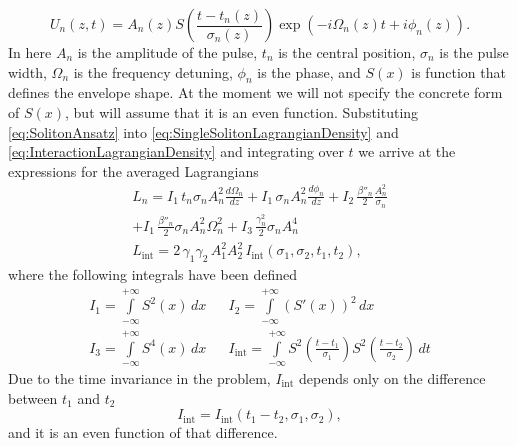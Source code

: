 \documentclass[a4paper,11pt]{article}
\begin{document}
\begin{equation}
  \label{eq:SolitonAnsatz}
  U_{n}(z, t) = A_{n}(z) S\left(
    \frac{t - t_{n}(z)}{\sigma_{n}(z)}
  \right) \exp\left(
    - i \Omega_{n}(z) t + i \phi_{n}(z)
  \right).
\end{equation}
In here $A_{n}$ is the amplitude of the pulse, $t_{n}$ is the central position, $\sigma_{n}$ is the pulse width, $\Omega_{n}$ is the frequency detuning, $\phi_{n}$ is the phase, and $S(x)$ is function that defines the envelope shape. At the moment we will not specify the concrete form of $S(x)$, but will assume that it is an even function. Substituting \eqref{eq:SolitonAnsatz} into \eqref{eq:SingleSolitonLagrangianDensity} and \eqref{eq:InteractionLagrangianDensity} and integrating over $t$ we arrive at the expressions for the averaged Lagrangians
\begin{gather}
  L_{n} =
    I_{1} \, t_{n} \sigma_{n} A_{n}^{2} \frac{d \Omega_{n}}{d z} +
    I_{1} \, \sigma_{n} A_{n}^{2} \frac{d \phi_{n}}{d z} +
    I_{2} \, \frac{\beta''_{n}}{2} \frac{A_{n}^{2}}{\sigma_{n}} \nonumber \\
    + I_{1} \, \frac{\beta''_{n}}{2} \sigma_{n} A_{n}^{2} \Omega_{n}^{2} +
    I_{3} \, \frac{\gamma_{n}^{2}}{2} \sigma_{n} A_{n}^{4} \\
  L_{\text{int}} =
    2 \, \gamma_{1} \gamma_{2} \, A_{1}^{2} A_{2}^{2} \,
    I_{\text{int}}(\sigma_{1}, \sigma_{2}, t_{1}, t_{2}),
\end{gather}
where the following integrals have been defined
\begin{align*}
  I_{1} =
    \int \limits_{-\infty}^{+\infty}
    S^{2}(x) \, dx &&
  I_{2} =
    \int \limits_{-\infty}^{+\infty}
    (S'(x))^{2} \, dx \\
  I_{3} =
    \int \limits_{-\infty}^{+\infty}
    S^{4}(x) \, dx &&
  I_{\text{int}} =
    \int \limits_{-\infty}^{+\infty}
    S^{2}\left(
      \frac{t - t_{1}}{\sigma_{1}}
    \right)
    S^{2}\left(
      \frac{t - t_{2}}{\sigma_{2}}
    \right) \, dt
\end{align*}
Due to the time invariance in the problem, $I_{\text{int}}$ depends only on the difference between $t_{1}$ and $t_{2}$
\begin{equation*}
  I_{\text{int}} = I_{\text{int}}(t_{1} - t_{2}, \sigma_{1}, \sigma_{2}),
\end{equation*}
and it is an even function of that difference.
\end{document}

